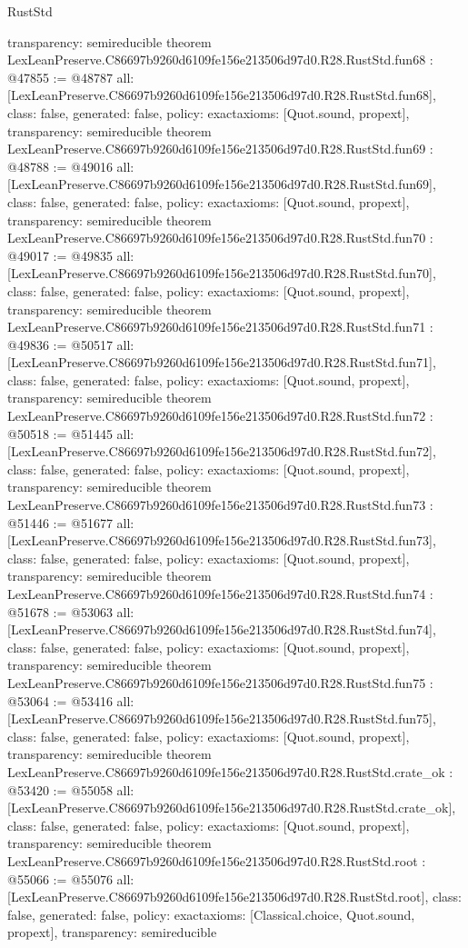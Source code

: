 \begin{lexlean}{RustStd}
\begin{coremodule}
{  transparency: semireducible
}
theorem LexLeanPreserve.C86697b9260d6109fe156e213506d97d0.R28.RustStd.fun68 : @47855 := @48787 {
  all: [LexLeanPreserve.C86697b9260d6109fe156e213506d97d0.R28.RustStd.fun68],
  class: false,
  generated: false,
  policy: exact{axioms: [Quot.sound, propext]},
  transparency: semireducible
}
theorem LexLeanPreserve.C86697b9260d6109fe156e213506d97d0.R28.RustStd.fun69 : @48788 := @49016 {
  all: [LexLeanPreserve.C86697b9260d6109fe156e213506d97d0.R28.RustStd.fun69],
  class: false,
  generated: false,
  policy: exact{axioms: [Quot.sound, propext]},
  transparency: semireducible
}
theorem LexLeanPreserve.C86697b9260d6109fe156e213506d97d0.R28.RustStd.fun70 : @49017 := @49835 {
  all: [LexLeanPreserve.C86697b9260d6109fe156e213506d97d0.R28.RustStd.fun70],
  class: false,
  generated: false,
  policy: exact{axioms: [Quot.sound, propext]},
  transparency: semireducible
}
theorem LexLeanPreserve.C86697b9260d6109fe156e213506d97d0.R28.RustStd.fun71 : @49836 := @50517 {
  all: [LexLeanPreserve.C86697b9260d6109fe156e213506d97d0.R28.RustStd.fun71],
  class: false,
  generated: false,
  policy: exact{axioms: [Quot.sound, propext]},
  transparency: semireducible
}
theorem LexLeanPreserve.C86697b9260d6109fe156e213506d97d0.R28.RustStd.fun72 : @50518 := @51445 {
  all: [LexLeanPreserve.C86697b9260d6109fe156e213506d97d0.R28.RustStd.fun72],
  class: false,
  generated: false,
  policy: exact{axioms: [Quot.sound, propext]},
  transparency: semireducible
}
theorem LexLeanPreserve.C86697b9260d6109fe156e213506d97d0.R28.RustStd.fun73 : @51446 := @51677 {
  all: [LexLeanPreserve.C86697b9260d6109fe156e213506d97d0.R28.RustStd.fun73],
  class: false,
  generated: false,
  policy: exact{axioms: [Quot.sound, propext]},
  transparency: semireducible
}
theorem LexLeanPreserve.C86697b9260d6109fe156e213506d97d0.R28.RustStd.fun74 : @51678 := @53063 {
  all: [LexLeanPreserve.C86697b9260d6109fe156e213506d97d0.R28.RustStd.fun74],
  class: false,
  generated: false,
  policy: exact{axioms: [Quot.sound, propext]},
  transparency: semireducible
}
theorem LexLeanPreserve.C86697b9260d6109fe156e213506d97d0.R28.RustStd.fun75 : @53064 := @53416 {
  all: [LexLeanPreserve.C86697b9260d6109fe156e213506d97d0.R28.RustStd.fun75],
  class: false,
  generated: false,
  policy: exact{axioms: [Quot.sound, propext]},
  transparency: semireducible
}
theorem LexLeanPreserve.C86697b9260d6109fe156e213506d97d0.R28.RustStd.crate_ok : @53420 := @55058 {
  all: [LexLeanPreserve.C86697b9260d6109fe156e213506d97d0.R28.RustStd.crate_ok],
  class: false,
  generated: false,
  policy: exact{axioms: [Quot.sound, propext]},
  transparency: semireducible
}
theorem LexLeanPreserve.C86697b9260d6109fe156e213506d97d0.R28.RustStd.root : @55066 := @55076 {
  all: [LexLeanPreserve.C86697b9260d6109fe156e213506d97d0.R28.RustStd.root],
  class: false,
  generated: false,
  policy: exact{axioms: [Classical.choice, Quot.sound, propext]},
  transparency: semireducible
}


\end{coremodule}
\end{lexlean}
